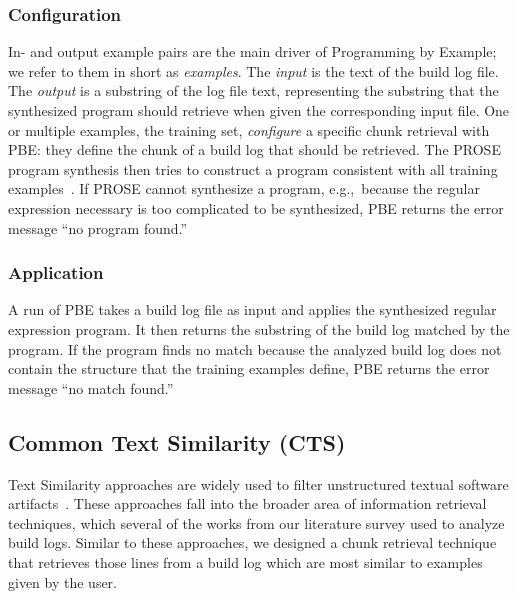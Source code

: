 \subsubsection{Configuration}
In- and output example pairs are the main driver of Programming by
Example; we refer to them in short as \emph{examples}.
The \emph{input} is the text of the build log file.
The \emph{output} is
a substring of the log file text, representing the
substring that the synthesized program should retrieve when
given the corresponding input file.
One or multiple examples, the
training set, \emph{configure} a specific chunk retrieval with PBE:
they define the chunk of a build log that should be retrieved.
The PROSE program synthesis then tries to construct a program
consistent with all training
examples~\cite{mitchell1982generalization}.
If PROSE cannot synthesize a program, e.g.,\
because the regular expression
necessary is too complicated to be synthesized, PBE returns the
error message ``no program found.''

\subsubsection{Application}
A run of PBE takes a build log file as input and applies the
synthesized regular expression program.
It then returns the substring
of the build log matched by the program.
If the program finds no match because the analyzed build log
does not contain the structure that the training examples define,
PBE returns the error message ``no match found.''

\subsection{Common Text Similarity (CTS)}
Text Similarity approaches are widely used to filter unstructured
textual software artifacts~\cite{runeson2007detection,
marcus2005recovery,antoniol2002recovering,mccarey2006recommending}.
These approaches fall into the broader area of information retrieval
techniques, which several of the works from our literature survey
used to analyze build logs.
Similar to these approaches, we designed a chunk retrieval
technique that
retrieves those lines from a build log which are most
similar to examples given by the user.

